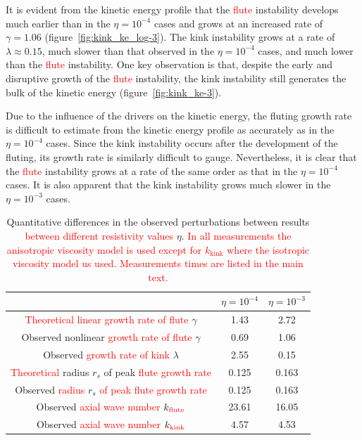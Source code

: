 \documentclass[12pt]{article}
\newcommand{\rs}[2]{\textcolor{red}{#2}}
\begin{document}
It is evident from the kinetic energy profile that the \rs{fluting}{flute} instability develops much earlier than in the $\eta=10^{-4}$ cases and grows at an increased rate of $\gamma = 1.06$ (figure~\ref{fig:kink_ke_log-3}). The kink instability grows at a rate of $\lambda \approx 0.15$, much slower than that observed in the $\eta=10^{-4}$ cases, and much lower than the \rs{fluting}{flute} instability. One key observation is that, despite the early and disruptive growth of the \rs{fluting}{flute} instability, the kink instability still generates the bulk of the kinetic energy (figure~\ref{fig:kink_ke-3}).

Due to the influence of the drivers on the kinetic energy, the fluting growth rate is difficult to estimate from the kinetic energy profile as accurately as in the $\eta=10^{-4}$ cases. Since the kink instability occurs after the development of the fluting, its growth rate is similarly difficult to gauge. Nevertheless, it is clear that the \rs{fluting}{flute} instability grows at a rate of the same order as that in the $\eta=10^{-4}$ cases. It is also apparent that the kink instability grows much slower in the $\eta=10^{-3}$ cases.

\begin{table}[]
\centering
\begin{tabular}{ccc}
&
$\eta=10^{-4}$ &
$\eta=10^{-3}$ \\
\midrule
\rs{Predicted linear}{Theoretical linear growth rate of flute} $\gamma$ & 1.43 & 2.72  \\
Observed nonlinear \rs{}{growth rate of flute} $\gamma$ & 0.69 & 1.06  \\
Observed \rs{}{growth rate of kink} $\lambda$ & 2.55 & 0.15\\
\midrule
\rs{}{Theoretical} radius $r_s$ of peak \rs{$\gamma$}{flute growth rate} & 0.125 & 0.163 \\
Observed \rs{}{radius} $r_s$ \rs{}{of peak flute growth rate} & 0.125 & 0.163 \\
\midrule
Observed \rs{}{axial wave number} $k_{\rs{flute}{\text{flute}}}$ & 23.61 & 16.05 \\
Observed \rs{}{axial wave number} $k_{\rs{kink}{\text{kink}}}$ & 4.57 & 4.53 \\
\end{tabular}
\caption{Quantitative differences in the observed perturbations
  between results \rs{for both values of}{between different
    resistivity values} $\eta$. \rs{}{In all measurements the
  anisotropic viscosity model is used except for $k_\text{kink}$ where the
  isotropic viscosity model us used. Measurements times are listed in
  the main text.}}
\label{tab:kink_fluting_params}
\end{table}
\end{document}
